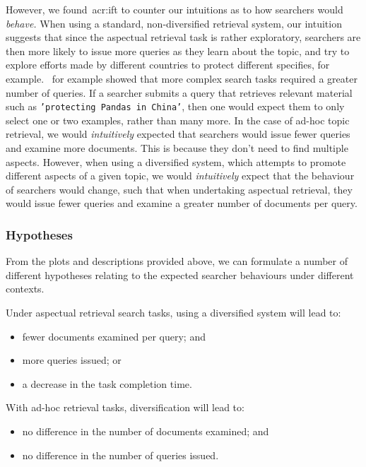 However, we found~\gls{acr:ift} to counter our intuitions as to how searchers would \emph{behave.} When using a standard, non-diversified retrieval system, our intuition suggests that since the aspectual retrieval task is rather exploratory, searchers are then more likely to issue more queries as they learn about the topic, and try to explore efforts made by different countries to protect different specifies, for example.~\cite{kelly2015search_tasks} for example showed that more complex search tasks required a greater number of queries. If a searcher submits a query that retrieves relevant material such as \texttt{'protecting Pandas in China'}, then one would expect them to only select one or two examples, rather than many more. In the case of ad-hoc topic retrieval, we would \emph{intuitively} expected that searchers would issue fewer queries and examine more documents. This is because they don't need to find multiple aspects. However, when using a diversified system, which attempts to promote different aspects of a given topic, we would \emph{intuitively} expect that the behaviour of searchers would change, such that when undertaking aspectual retrieval, they would issue fewer queries and examine a greater number of documents per query.

\subsubsection{Hypotheses}\label{sec:diversity:background:tasks:hypotheses}
From the plots and descriptions provided above, we can formulate a number of different hypotheses relating to the expected searcher behaviours under different contexts.

Under aspectual retrieval search tasks, using a diversified system will lead to:
\begin{itemize}
    \item{ fewer documents examined per query; and}
    \item{ more queries issued; or}
    \item{ a decrease in the task completion time.}
\end{itemize}

With ad-hoc retrieval tasks, diversification will lead to:
\begin{itemize}
    \item{ no difference in the number of documents examined; and}
    \item{ no difference in the number of queries issued.}
\end{itemize}

